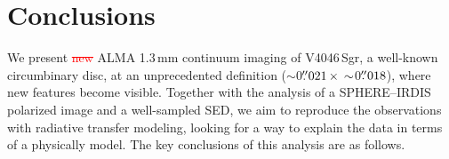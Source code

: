 \documentclass[fleqn,usenatbib,useAMS]{mnras}
\newcommand{\red}[1]{\textcolor{red}{#1}}
\begin{document}
\section{Conclusions} \label{sec:Conclusions}

We present \red{\sout{new}} ALMA 1.3\,mm continuum imaging of V4046\,Sgr, a well-known circumbinary disc, at an unprecedented definition ($\sim$0$\hbox{$.\!\!^{\prime\prime}$}021 \, \times \, \sim$0$\hbox{$.\!\!^{\prime\prime}$}018$), where new features become visible. Together with the analysis of a SPHERE--IRDIS polarized image and a well-sampled SED, we aim to reproduce the observations with radiative transfer modeling, looking for a way to explain the data in terms of a physically model. The key conclusions of this analysis are as follows.
\end{document}
